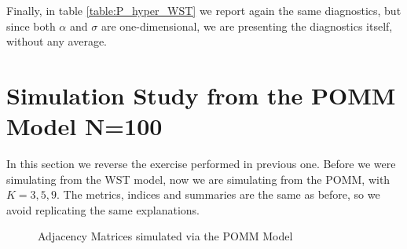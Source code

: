 \documentclass[11pt]{amsart}
\begin{document}
Finally, in table \eqref{table:P_hyper_WST} we report again the same diagnostics, but since both $\alpha$ and $\sigma$ are one-dimensional, we are presenting the diagnostics itself, without any average.




\clearpage


\section{Simulation Study from the POMM Model N=100}

In this section we reverse the exercise performed in previous one. Before we were simulating from the WST model, now we are simulating from the POMM, with $K=3,5,9$.  The metrics, indices and summaries are the same as before, so we avoid replicating the same explanations.
\begin{figure}[h]
    \centering
    \hfill
    \hfill
    \caption{Adjacency Matrices simulated via the POMM Model}
    \label{fig:all_images}
\end{figure}
\end{document}
